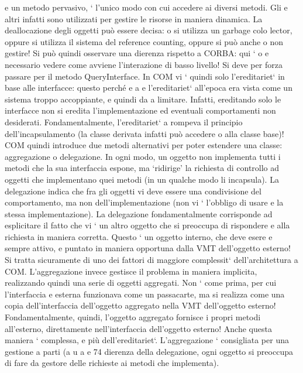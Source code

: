 \documentclass[a4paper,12pt]{article}
\begin{document}
e
un metodo pervasivo, ` l'unico modo con cui accedere ai diversi metodi. Gli
e
altri infatti sono utilizzati per gestire le risorse in maniera dinamica.
La deallocazione degli oggetti può essere decisa: o si utilizza un garbage colo
lector, oppure si utilizza il sistema del reference counting, oppure si può anche
o
non gestire! Si può quindi osservare una dierenza rispetto a CORBA: qui `
o
e
necessario vedere come avviene l'interazione di basso livello! Si deve per forza
passare per il metodo QueryInterface.
In COM vi ` quindi solo l'ereditariet` in base alle interfacce: questo perché
e
a
e
l'ereditariet` all'epoca era vista come un sistema troppo accoppiante, e quindi da
a
limitare. Infatti, ereditando solo le interfacce non si eredita l'implementazione
ed eventuali comportamenti non desiderati. Fondamentalmente, l'ereditariet`
a
rompeva il principio dell'incapsulamento (la classe derivata infatti può accedere
o
alla classe base)!
COM quindi introduce due metodi alternativi per poter estendere una classe:
aggregazione o delegazione. In ogni modo, un oggetto non implementa tutti i
metodi che la sua interfaccia espone, ma {`}ridirige' la richiesta di controllo ad
oggetti che implementano quei metodi (in un qualche modo li incapsula).
La delegazione indica che fra gli oggetti vi deve essere una condivisione
del comportamento, ma non dell'implementazione (non vi ` l'obbligo di usare
e
la stessa implementazione). La delegazione fondamentalmente corrisponde ad
esplicitare il fatto che vi ` un altro oggetto che si preoccupa di rispondere
e
alla richiesta in maniera corretta. Questo ` un oggetto interno, che deve esere
e
sempre attivo, e puntato in maniera opportuna dalla VMT dell'oggetto esterno!
Si tratta sicuramente di uno dei fattori di maggiore complessit` dell'architettura
a
COM.
L'aggregazione invece gestisce il problema in maniera implicita, realizzando
quindi una serie di oggetti aggregati. Non ` come prima, per cui l'interfaccia
e
esterna funzionava come un passacarte, ma si realizza come una copia dell'interfaccia dell'oggetto aggregato nella VMT
dell'oggetto esterno! Fondamentalmente, quindi, l'oggetto aggregato fornisce i propri metodi all'esterno, direttamente
nell'interfaccia dell'oggetto esterno! Anche questa maniera ` complessa,
e
più dell'ereditariet`. L'aggregazione ` consigliata per una gestione a parti (a
u
a
e
74
dierenza della delegazione, ogni oggetto si preoccupa di fare da gestore delle
richieste ai metodi che implementa).
\end{document}
